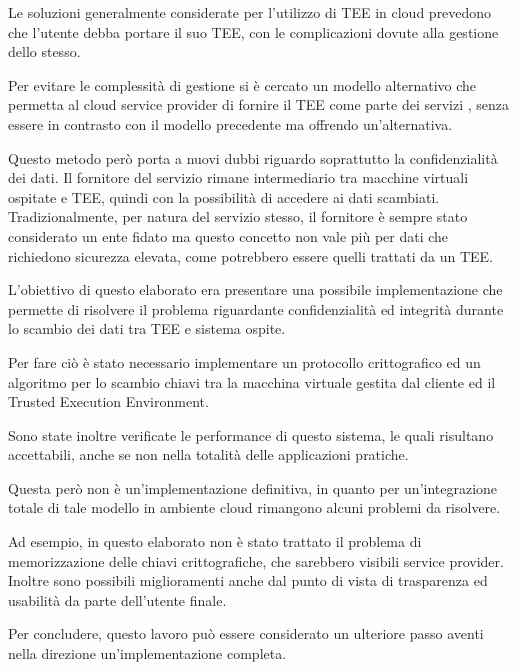\documentclass[12pt,italian]{report}
\begin{document}
	\medbreak
	
	Le soluzioni generalmente considerate per l'utilizzo di TEE in cloud prevedono che l'utente debba portare il suo TEE, con le complicazioni dovute alla gestione dello stesso. 
	
	Per evitare le complessità di gestione si è cercato un modello alternativo che permetta al cloud service provider di fornire il TEE come parte dei servizi \cite{tesi_cutecchia}, senza essere in contrasto con il modello precedente ma offrendo un'alternativa. 
	
	Questo metodo però porta a nuovi dubbi riguardo soprattutto la confidenzialità dei dati. Il fornitore del servizio rimane intermediario tra macchine virtuali ospitate e TEE, quindi con la possibilità di accedere ai dati scambiati. Tradizionalmente, per natura del servizio stesso, il fornitore è sempre stato considerato un ente fidato ma questo concetto non vale più per dati che richiedono sicurezza elevata, come potrebbero essere quelli trattati da un TEE. 
	
	\medbreak
	
	L'obiettivo di questo elaborato era presentare una possibile implementazione che permette di risolvere il problema riguardante confidenzialità ed integrità durante lo scambio dei dati tra TEE e sistema ospite.
	
	Per fare ciò è stato necessario implementare un protocollo crittografico ed un algoritmo per lo scambio chiavi tra la macchina virtuale gestita dal cliente ed il Trusted Execution Environment. 
	
	Sono state inoltre verificate le performance di questo sistema, le quali risultano accettabili, anche se non nella totalità delle applicazioni pratiche.
	
	\medbreak
	
	Questa però non è un'implementazione definitiva, in quanto per un'integrazione totale di tale modello in ambiente cloud rimangono alcuni problemi da risolvere. 
	
	Ad esempio, in questo elaborato non è stato trattato il problema di memorizzazione delle chiavi crittografiche, che sarebbero visibili service provider. Inoltre sono possibili miglioramenti anche dal punto di vista di trasparenza ed usabilità da parte dell'utente finale.
	
	Per concludere, questo lavoro può essere considerato un ulteriore passo aventi nella direzione un'implementazione completa.
	
	
	
	
	
\end{document}

